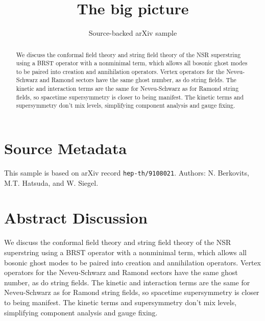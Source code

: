 \documentclass[11pt]{article}
\title{The big picture}
\author{Source-backed arXiv sample}
\date{}
\begin{document}
\maketitle
\begin{abstract}
We discuss the conformal field theory and string field theory of the NSR superstring using a BRST operator with a nonminimal term, which allows all bosonic ghost modes to be paired into creation and annihilation operators. Vertex operators for the Neveu-Schwarz and Ramond sectors have the same ghost number, as do string fields. The kinetic and interaction terms are the same for Neveu-Schwarz as for Ramond string fields, so spacetime supersymmetry is closer to being manifest. The kinetic terms and supersymmetry don't mix levels, simplifying component analysis and gauge fixing.
\end{abstract}
\section{Source Metadata}
This sample is based on arXiv record \texttt{hep-th/9108021}. Authors: N. Berkovits, M.T. Hatsuda, and W. Siegel.
\section{Abstract Discussion}
We discuss the conformal field theory and string field theory of the NSR superstring using a BRST operator with a nonminimal term, which allows all bosonic ghost modes to be paired into creation and annihilation operators. Vertex operators for the Neveu-Schwarz and Ramond sectors have the same ghost number, as do string fields. The kinetic and interaction terms are the same for Neveu-Schwarz as for Ramond string fields, so spacetime supersymmetry is closer to being manifest. The kinetic terms and supersymmetry don't mix levels, simplifying component analysis and gauge fixing.
\end{document}
